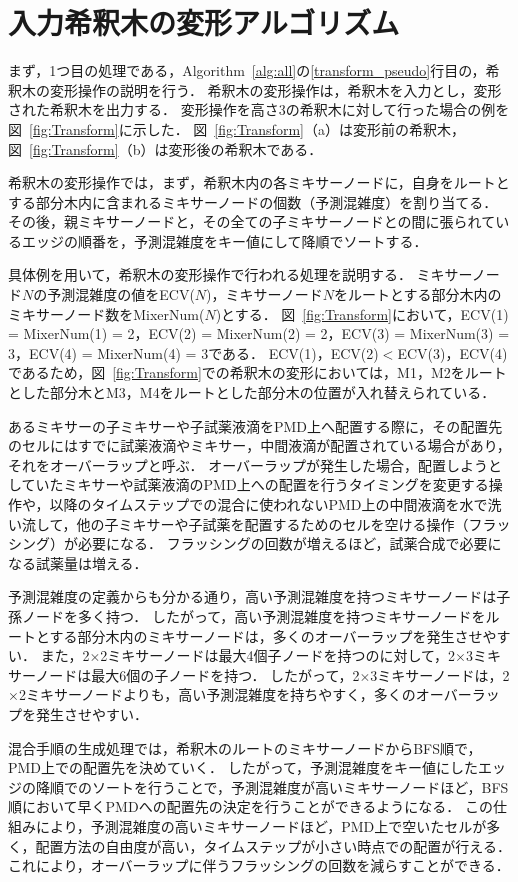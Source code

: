 \section{入力希釈木の変形アルゴリズム}
まず，1つ目の処理である，Algorithm~\ref{alg:all}の\ref{transform_pseudo}行目の，希釈木の変形操作の説明を行う． 希釈木の変形操作は，希釈木を入力とし，変形された希釈木を出力する． 変形操作を高さ3の希釈木に対して行った場合の例を図~\ref{fig:Transform}に示した．
図~\ref{fig:Transform}（a）は変形前の希釈木，図~\ref{fig:Transform}（b）は変形後の希釈木である．

希釈木の変形操作では，まず，希釈木内の各ミキサーノードに，自身をルートとする部分木内に含まれるミキサーノードの個数（予測混雑度）を割り当てる．
その後，親ミキサーノードと，その全ての子ミキサーノードとの間に張られているエッジの順番を，予測混雑度をキー値にして降順でソートする． 

具体例を用いて，希釈木の変形操作で行われる処理を説明する．
ミキサーノード$N$の予測混雑度の値をECV($N$)，ミキサーノード$N$をルートとする部分木内のミキサーノード数をMixerNum($\mathit{N}$)とする．
図~\ref{fig:Transform}において，ECV(1) = MixerNum(1) = 2，ECV(2) = MixerNum(2) = 2，ECV(3) = MixerNum(3) = 3，ECV(4) = MixerNum(4) = 3である．
ECV(1)，ECV(2)$<$ECV(3)，ECV(4)であるため，図~\ref{fig:Transform}での希釈木の変形においては，M1，M2をルートとした部分木とM3，M4をルートとした部分木の位置が入れ替えられている．

あるミキサーの子ミキサーや子試薬液滴をPMD上へ配置する際に，その配置先のセルにはすでに試薬液滴やミキサー，中間液滴が配置されている場合があり，それをオーバーラップと呼ぶ．
オーバーラップが発生した場合，配置しようとしていたミキサーや試薬液滴のPMD上への配置を行うタイミングを変更する操作や，以降のタイムステップでの混合に使われないPMD上の中間液滴を水で洗い流して，他の子ミキサーや子試薬を配置するためのセルを空ける操作（フラッシング）が必要になる．
フラッシングの回数が増えるほど，試薬合成で必要になる試薬量は増える．

予測混雑度の定義からも分かる通り，高い予測混雑度を持つミキサーノードは子孫ノードを多く持つ．
したがって，高い予測混雑度を持つミキサーノードをルートとする部分木内のミキサーノードは，多くのオーバーラップを発生させやすい．
また，2$\times$2ミキサーノードは最大4個子ノードを持つのに対して，2$\times$3ミキサーノードは最大6個の子ノードを持つ．
したがって，2$\times$3ミキサーノードは，2$\times$2ミキサーノードよりも，高い予測混雑度を持ちやすく，多くのオーバーラップを発生させやすい．

混合手順の生成処理では，希釈木のルートのミキサーノードからBFS順で，PMD上での配置先を決めていく．
したがって，予測混雑度をキー値にしたエッジの降順でのソートを行うことで，予測混雑度が高いミキサーノードほど，BFS順において早くPMDへの配置先の決定を行うことができるようになる．
この仕組みにより，予測混雑度の高いミキサーノードほど，PMD上で空いたセルが多く，配置方法の自由度が高い，タイムステップが小さい時点での配置が行える．
これにより，オーバーラップに伴うフラッシングの回数を減らすことができる．

